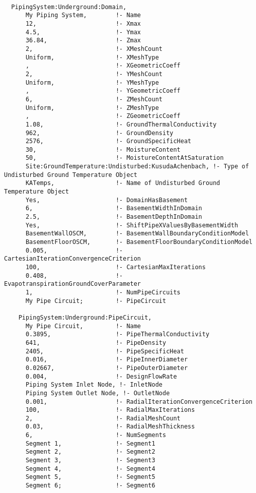 \begin{lstlisting}

  PipingSystem:Underground:Domain,
      My Piping System,        !- Name
      12,                      !- Xmax
      4.5,                     !- Ymax
      36.84,                   !- Zmax
      2,                       !- XMeshCount
      Uniform,                 !- XMeshType
      ,                        !- XGeometricCoeff
      2,                       !- YMeshCount
      Uniform,                 !- YMeshType
      ,                        !- YGeometricCoeff
      6,                       !- ZMeshCount
      Uniform,                 !- ZMeshType
      ,                        !- ZGeometricCoeff
      1.08,                    !- GroundThermalConductivity
      962,                     !- GroundDensity
      2576,                    !- GroundSpecificHeat
      30,                      !- MoistureContent
      50,                      !- MoistureContentAtSaturation
      Site:GroundTemperature:Undisturbed:KusudaAchenbach, !- Type of Undisturbed Ground Temperature Object
      KATemps,                 !- Name of Undisturbed Ground Temperature Object
      Yes,                     !- DomainHasBasement
      6,                       !- BasementWidthInDomain
      2.5,                     !- BasementDepthInDomain
      Yes,                     !- ShiftPipeXValuesByBasementWidth
      BasementWallOSCM,        !- BasementWallBoundaryConditionModel
      BasementFloorOSCM,       !- BasementFloorBoundaryConditionModel
      0.005,                   !- CartesianIterationConvergenceCriterion
      100,                     !- CartesianMaxIterations
      0.408,                   !- EvapotranspirationGroundCoverParameter
      1,                       !- NumPipeCircuits
      My Pipe Circuit;         !- PipeCircuit

    PipingSystem:Underground:PipeCircuit,
      My Pipe Circuit,         !- Name
      0.3895,                  !- PipeThermalConductivity
      641,                     !- PipeDensity
      2405,                    !- PipeSpecificHeat
      0.016,                   !- PipeInnerDiameter
      0.02667,                 !- PipeOuterDiameter
      0.004,                   !- DesignFlowRate
      Piping System Inlet Node, !- InletNode
      Piping System Outlet Node, !- OutletNode
      0.001,                   !- RadialIterationConvergenceCriterion
      100,                     !- RadialMaxIterations
      2,                       !- RadialMeshCount
      0.03,                    !- RadialMeshThickness
      6,                       !- NumSegments
      Segment 1,               !- Segment1
      Segment 2,               !- Segment2
      Segment 3,               !- Segment3
      Segment 4,               !- Segment4
      Segment 5,               !- Segment5
      Segment 6;               !- Segment6


\end{lstlisting}
